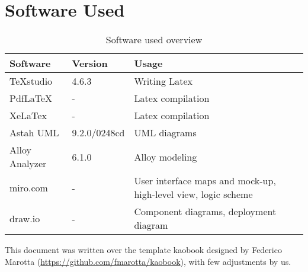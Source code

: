 \chapter{Software Used}
\begin{center}
	\begin{table}[H]
		\begin{tabular}{ | m{3cm} | m{3cm} | m{3cm} | } 
			\hline
			\textbf {Software} & \textbf{Version} & \textbf{Usage} \\
			\hline
			TeXstudio & 4.6.3 & Writing Latex \\
			\hline
			PdfLaTeX & - & Latex compilation \\
			\hline
			XeLaTex & - & Latex compilation \\
			\hline
			Astah UML & 9.2.0/0248cd & UML diagrams \\
			\hline
			Alloy Analyzer & 6.1.0 & Alloy modeling \\
			\hline
			miro.com & - & User interface maps and mock-up, high-level view, logic scheme \\
			\hline
			draw.io & - & Component diagrams, deployment diagram \\
			\hline
		\end{tabular}
		\caption{Software used overview}
	\end{table}
\end{center}

This document was written over the template kaobook designed by Federico Marotta (\url{https://github.com/fmarotta/kaobook}), with few adjustments by us.